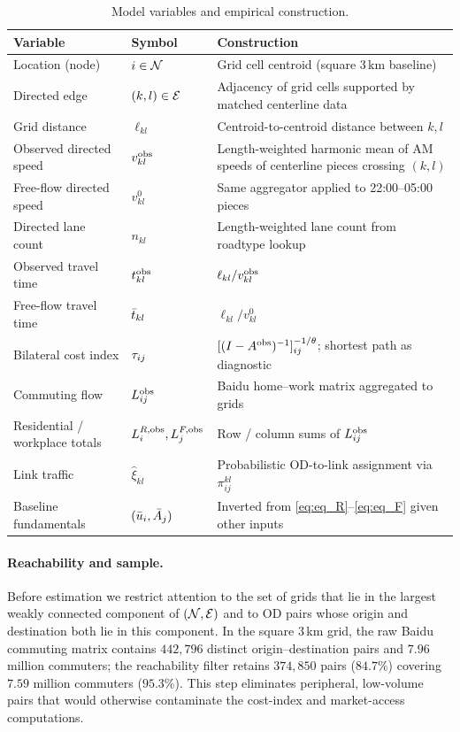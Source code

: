 \begin{table}[h!]
\centering
\caption{Model variables and empirical construction.}\label{tab:data_mapping}
\small
\begin{tabular}{p{3.6cm}lp{7.8cm}}
\toprule
Variable & Symbol & Construction \\
\midrule
Location (node) & $i\in\mathcal N$ & Grid cell centroid (square 3\,km baseline) \\
Directed edge & $(k,l)\in\mathcal E$ & Adjacency of grid cells supported by matched centerline data \\
Grid distance & $\ell_{kl}$ & Centroid-to-centroid distance between $k,l$ \\
Observed directed speed & $v_{kl}^{\mathrm{obs}}$ & Length-weighted harmonic mean of AM speeds of centerline pieces crossing $(k,l)$ \\
Free-flow directed speed & $v_{kl}^{0}$ & Same aggregator applied to 22:00--05:00 pieces \\
Directed lane count & $n_{kl}$ & Length-weighted lane count from roadtype lookup \\
Observed travel time & $t_{kl}^{\mathrm{obs}}$ & $\ell_{kl}/v_{kl}^{\mathrm{obs}}$ \\
Free-flow travel time & $\bar t_{kl}$ & $\ell_{kl}/v_{kl}^{0}$ \\
Bilateral cost index & $\tau_{ij}$ & $[(I-A^{\mathrm{obs}})^{-1}]_{ij}^{-1/\theta}$; shortest path as diagnostic \\
Commuting flow & $L_{ij}^{\mathrm{obs}}$ & Baidu home--work matrix aggregated to grids \\
Residential / workplace totals & $L_i^{R,\mathrm{obs}},L_j^{F,\mathrm{obs}}$ & Row / column sums of $L_{ij}^{\mathrm{obs}}$ \\
Link traffic & $\hat\xi_{kl}$ & Probabilistic OD-to-link assignment via $\pi^{kl}_{ij}$ \\
Baseline fundamentals & $(\bar u_i,\bar A_j)$ & Inverted from \eqref{eq:eq_R}--\eqref{eq:eq_F} given other inputs \\
\bottomrule
\end{tabular}
\end{table}

\paragraph{Reachability and sample.}
Before estimation we restrict attention to the set of grids that lie
in the largest weakly connected component of $(\mathcal N,\mathcal E)$ and to OD
pairs whose origin and destination both lie in this component.  In
the square 3\,km grid, the raw Baidu commuting matrix contains
$442{,}796$ distinct origin--destination pairs and $7.96$ million
commuters; the reachability filter retains $374{,}850$ pairs
($84.7\%$) covering $7.59$ million commuters ($95.3\%$).  This step
eliminates peripheral, low-volume pairs that would otherwise
contaminate the cost-index and market-access computations.


